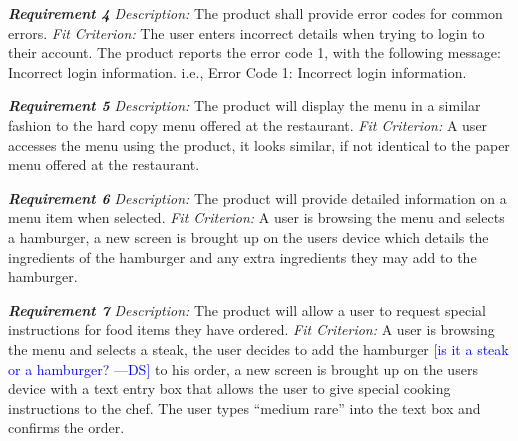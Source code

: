 \documentclass[12pt, titlepage]{article}
\newcommand{\authornote}[3]{\textcolor{#1}{[#3 ---#2]}}
\newcommand{\authornote}[3]{}
\newcommand{\ds}[1]{\authornote{blue}{DS}{#1}}
\begin{document}
\noindent\textbf{\textit{Requirement 4}}\newline
\textit{Description:}\newline
The product shall provide error codes for common errors. \newline\newline
\textit{Fit Criterion:}\newline 
The user enters incorrect details when trying to login to their account. The product reports the error code 1, with the following message: Incorrect login information. i.e., Error Code 1: Incorrect login information.
\newline

\noindent\textbf{\textit{Requirement 5}}\newline
\textit{Description:}\newline
The product will display the menu in a similar fashion to the hard copy menu offered at the restaurant. \newline\newline
\textit{Fit Criterion:}\newline 
A user accesses the menu using the product, it looks similar, if not identical to the paper menu offered at the restaurant.
\newline

\noindent\textbf{\textit{Requirement 6}}\newline
\textit{Description:}\newline
The product will provide detailed information on a menu item when selected. \newline\newline
\textit{Fit Criterion:}\newline 
A user is browsing the menu and selects a hamburger, a new screen is brought up on the users device which details the ingredients of the hamburger and any extra ingredients they may add to the hamburger.
\newline

\noindent\textbf{\textit{Requirement 7}}\newline
\textit{Description:}\newline
The product will allow a user to request special instructions for food items they have ordered. \newline\newline
\textit{Fit Criterion:}\newline 
A user is browsing the menu and selects a steak, the user decides to add the hamburger
\ds{is it a steak or a hamburger?}
to his order, a new screen is brought up on the users device with a text entry box that allows the user to give special cooking instructions to the chef. The user types “medium rare” into the text box and confirms the order.
\newline
\end{document}

